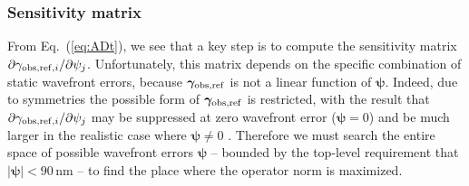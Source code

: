 \documentclass[aps,prd, amsmath,amssymb,superscriptaddress,showkeys,nofootinbib,reprint,preprintnumbers]{revtex4-1}
\begin{document}
\begin{widetext}
\subsubsection{Sensitivity matrix}
\label{as:drift-sens}

From Eq.~(\ref{eq:ADt}), we see that a key step is to compute the
sensitivity matrix $\partial \gamma_{{\rm
obs,ref},i}/\partial\psi_j$. Unfortunately, this matrix depends on the
specific combination of static wavefront errors, because
${\boldsymbol\gamma}_{\rm obs,ref}$ is not a linear function of
${\boldsymbol\psi}$. Indeed, due to symmetries the possible form of
${\boldsymbol\gamma}_{\rm obs,ref}$ is restricted, with the result
that $\partial \gamma_{{\rm obs,ref},i}/\partial\psi_j$ may be
suppressed at zero wavefront error (${\boldsymbol\psi}=0$) and be much
larger in the realistic case where ${\boldsymbol\psi}\neq 0$
\citep[e.g.][]{2010SPIE.7731E..1EN}. Therefore we must search the
entire space of possible wavefront errors ${\boldsymbol\psi}$ --
bounded by the top-level requirement that $|{\boldsymbol\psi}|<90\,$nm
-- to find the place where the operator norm is maximized.


\end{widetext}
\end{document}
